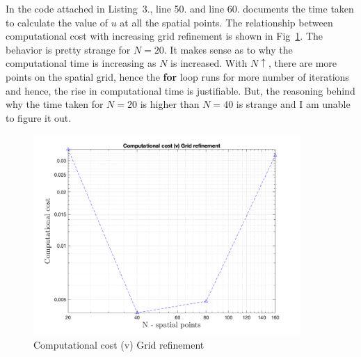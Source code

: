 \documentclass[11pt]{article}
\begin{document}
\begin{enumerate}
\begin{enumerate}
In the code attached in Listing~3., line 50. and line 60. documents the time taken to calculate the value of $u$ at all the spatial points. The relationship between computational cost with increasing grid refinement  is shown in Fig~\ref{fig:q3c}. The behavior is pretty strange for $N=20$. It makes sense as to why the computational time is increasing as $N$ is increased. With $N \uparrow$, there are more points on the spatial grid, hence the \textbf{for} loop runs for more number of iterations and hence, the rise in computational time is justifiable. But, the reasoning behind why the time taken for $N=20$ is higher than $N=40$ is strange and I am unable to figure it out.
\begin{figure}
\begin{center}
\includegraphics[width=4in]{cost_plot}
\end{center}
\caption{Computational cost (v) Grid refinement}
\label{fig:q3c}
\end{figure}

  \end{enumerate}
  
\end{enumerate}
\end{document}
